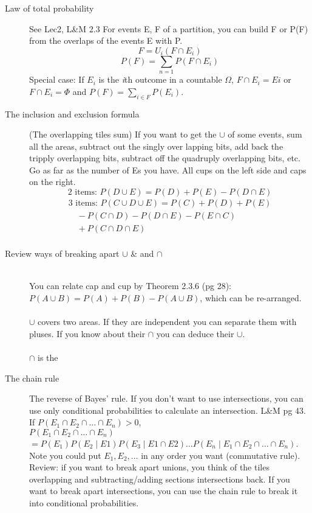 \begin{description}
\item[Law of total probability] See Lec2, L\&M 2.3 \newline
For events E, F of a partition, you can build F or P(F) from the overlaps of the events E with P.
	\[ F = U_i(F \cap E_i)  \]
	\[ P(F) = \sum_{n=1} P(F \cap E_i) \]
Special case: If $E_i$ is the \textit{i}th outcome in a countable $\Omega$, $F \cap E_i = Ei$ 
or $F \cap E_i = \Phi$ and $P(F) = \sum_{i \in F} P(E_i)$. 

\item[The inclusion and exclusion formula] (The overlapping tiles sum)
If you want to get the $\cup$ of some events, sum all the areas, subtract out the singly over lapping bits, add back the tripply overlapping bits, subtract off the quadruply overlapping bits, etc.  Go as far as the number of Es you have. 
All cups on the left side and caps on the right. 
	\[\mbox{2 items: } P(D \cup E) = P(D) + P(E) - P(D \cap E) \]
	\begin{align*}
	\mbox{3 items: }   
	P(C \cup D \cup E) = P(C) + P(D) + P(E) \\
	\quad - P(C \cap D) - P(D \cap E) - P(E \cap C) \\
	\quad + P(C \cap D \cap E) \\
	\end{align*}

\item[Review ways of breaking apart $\cup$ \& and $\cap$] \hfill \\

 You can relate cap and cup {\tiny by Theorem 2.3.6 (pg 28)}:
$P(A \cup B) = P(A) + P(B) - P(A \cup B)$, which can be re-arranged.  \hfill \\
\hfill \\
$\cup$ covers two areas.  If they are independent you can separate them with pluses.  If you know about their $\cap$ you can deduce their $\cup$.  \hfill \\
\hfill \\
$\cap$ is the

\item[The chain rule]  The reverse of Bayes' rule. If you don't want to use intersections, you can use only conditional probabilities to calculate an intersection.  {\tiny L\&M pg 43.}
If $P(E_1 \cap E_2 \cap \dots \cap E_n) > 0$, \hfill \\
$P(E_1 \cap E_2 \cap \dots \cap E_n)$  \hfill \\ 
$= P(E_1)P(E_2 \mid E1)P(E_3 \mid E1 \cap E2) \dots P(E_n \mid E_1 \cap E_2 \cap \dots \cap E_n)$.
 Note you could put $E_1, E_2, \dots$ in any order you want (commutative rule). 
 \hfill \\
Review: if you want to break apart unions, you think of the tiles overlapping and subtracting/adding sections intersections back.  If you want to break apart intersections, you can use the chain rule to break it into conditional probabilities.  
 \hfill \\
 

\end{description}
